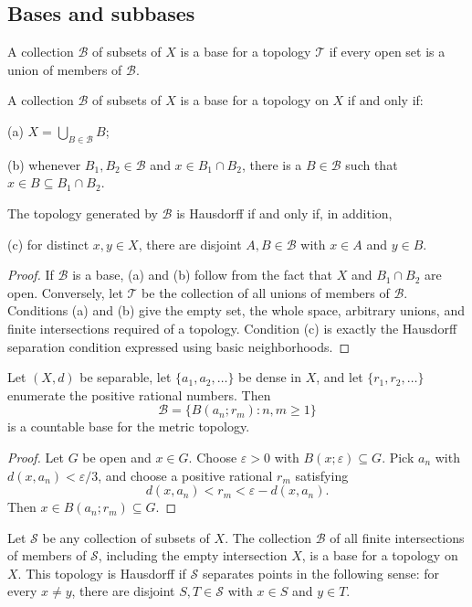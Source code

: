\subsection{Bases and subbases}

\begin{de}
A collection $\mathcal{B}$ of subsets of $X$ is a base for a topology
$\mathcal{T}$ if every open set is a union of members of $\mathcal{B}$.
\end{de}

\begin{thm}
A collection $\mathcal{B}$ of subsets of $X$ is a base for a topology on $X$
if and only if:

(a) $X=\bigcup_{B\in\mathcal{B}}B$;

(b) whenever $B_1,B_2\in\mathcal{B}$ and $x\in B_1\cap B_2$, there is a
$B\in\mathcal{B}$ such that
$x\in B\subseteq B_1\cap B_2$.

The topology generated by $\mathcal{B}$ is Hausdorff if and only if, in
addition,

(c) for distinct $x,y\in X$, there are disjoint $A,B\in\mathcal{B}$ with
$x\in A$ and $y\in B$.
\end{thm}

\begin{proof}
If $\mathcal{B}$ is a base, (a) and (b) follow from the fact that $X$ and
$B_1\cap B_2$ are open. Conversely, let $\mathcal{T}$ be the collection of
all unions of members of $\mathcal{B}$. Conditions (a) and (b) give the empty
set, the whole space, arbitrary unions, and finite intersections required of
a topology. Condition (c) is exactly the Hausdorff separation condition
expressed using basic neighborhoods.
\end{proof}

\begin{cor}
Let $(X,d)$ be separable, let $\{a_1,a_2,\ldots\}$ be dense in $X$, and let
$\{r_1,r_2,\ldots\}$ enumerate the positive rational numbers. Then
\[
\mathcal{B}=\{B(a_n;r_m):n,m\geq1\}
\]
is a countable base for the metric topology.
\end{cor}

\begin{proof}
Let $G$ be open and $x\in G$. Choose $\varepsilon>0$ with
$B(x;\varepsilon)\subseteq G$. Pick $a_n$ with
$d(x,a_n)<\varepsilon/3$, and choose a positive rational $r_m$ satisfying
\[
d(x,a_n)<r_m<\varepsilon-d(x,a_n).
\]
Then $x\in B(a_n;r_m)\subseteq G$.
\end{proof}

\begin{cor}
Let $\mathcal{S}$ be any collection of subsets of $X$. The collection
$\mathcal{B}$ of all finite intersections of members of $\mathcal{S}$,
including the empty intersection $X$, is a base for a topology on $X$.
This topology is Hausdorff if $\mathcal{S}$ separates points in the following
sense: for every $x\neq y$, there are disjoint $S,T\in\mathcal{S}$ with
$x\in S$ and $y\in T$.
\end{cor}

